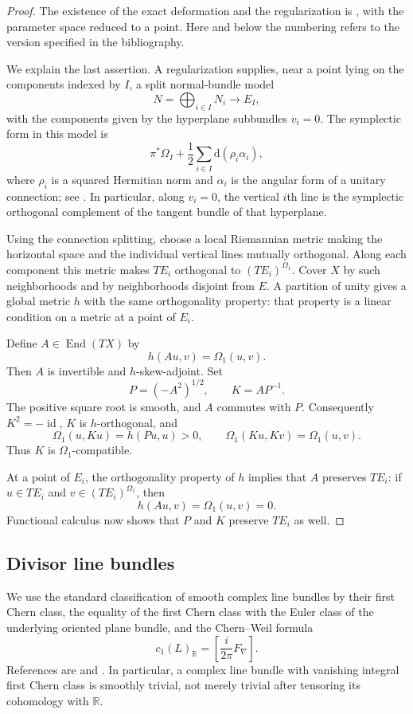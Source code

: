\documentclass[11pt]{article}
\theoremstyle{definition}
\theoremstyle{remark}
\newcommand{\R}{\mathbb R}
\newcommand{\dd}{\mathrm d}
\newcommand{\id}{\operatorname{id}}
\newcommand{\End}{\operatorname{End}}
\begin{document}
\begin{proof}
The existence of the exact deformation and the regularization is
\cite[Theorem~2.13]{TMZ}, with the parameter space reduced to a point.
Here and below the numbering refers to the version specified in the
bibliography.

We explain the last assertion.  A regularization supplies, near a
point lying on the components indexed by $I$, a split normal-bundle
model
\[
N=\bigoplus_{i\in I}N_i\longrightarrow E_I,
\]
with the components given by the hyperplane subbundles $v_i=0$.
The symplectic form in this model is
\[
\pi^*\Omega_I+\frac12\sum_{i\in I}\dd(\rho_i\alpha_i),
\]
where $\rho_i$ is a squared Hermitian norm and $\alpha_i$ is the
angular form of a unitary connection; see \cite[Section~2.2]{TMZ}.
In particular, along $v_i=0$, the vertical $i$th line is the
symplectic orthogonal complement of the tangent bundle of that
hyperplane.

Using the connection splitting, choose a local Riemannian metric
making the horizontal space and the individual vertical lines
mutually orthogonal.  Along each component this metric makes
$TE_i$ orthogonal to $(TE_i)^{\Omega_1}$.  Cover $X$ by such
neighborhoods and by neighborhoods disjoint from $E$.  A partition
of unity gives a global metric $h$ with the same orthogonality
property: that property is a linear condition on a metric at a
point of $E_i$.

Define $A\in\End(TX)$ by
\[
h(Au,v)=\Omega_1(u,v).
\]
Then $A$ is invertible and $h$-skew-adjoint.  Set
\[
P=(-A^2)^{1/2},\qquad K=AP^{-1}.
\]
The positive square root is smooth, and $A$ commutes with $P$.
Consequently $K^2=-\id$, $K$ is $h$-orthogonal, and
\[
\Omega_1(u,Ku)=h(Pu,u)>0,\qquad
\Omega_1(Ku,Kv)=\Omega_1(u,v).
\]
Thus $K$ is $\Omega_1$-compatible.

At a point of $E_i$, the orthogonality property of $h$ implies that
$A$ preserves $TE_i$: if $u\in TE_i$ and
$v\in(TE_i)^{\Omega_1}$, then
\[
h(Au,v)=\Omega_1(u,v)=0.
\]
Functional calculus now shows that $P$ and $K$ preserve $TE_i$
as well.
\end{proof}

\subsection{Divisor line bundles}

We use the standard classification of smooth complex line bundles by
their first Chern class, the equality of the first Chern class with
the Euler class of the underlying oriented plane bundle, and the
Chern--Weil formula
\[
c_1(L)_{\R}=\left[\frac{i}{2\pi}F_\nabla\right].
\]
References are \cite[Sections~9 and~14]{MS} and
\cite[Chapter~XII]{KN}.  In particular, a complex line bundle with
vanishing integral first Chern class is smoothly trivial, not merely
trivial after tensoring its cohomology with $\R$.
\end{document}
